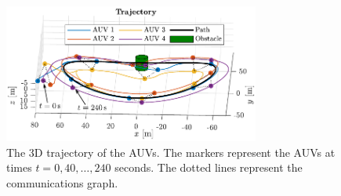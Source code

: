 \begin{figure}[htb]
    \centering
    \includegraphics[width=0.75\textwidth]{figures/distr_NSB/sim_trajectory.pdf}
    \vspace{-4mm}
    \caption{The 3D trajectory of the AUVs. The markers represent the AUVs at times $t = 0, 40, \ldots, 240$ seconds. The dotted lines represent the communications graph.}
    \label{fig:distr_NSB_sim_trajectory}
\end{figure}

